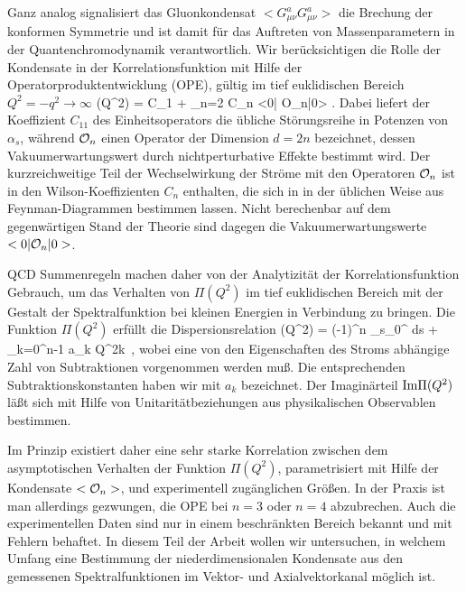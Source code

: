 Ganz analog signalisiert das Gluonkondensat $<G_{\mu\nu}^{a}
G^{a}_{\mu\nu}>$ die Brechung der konformen Symmetrie und ist 
damit f\"ur das Auftreten von Massenparametern in der 
Quantenchromodynamik verantwortlich. Wir ber\"ucksichtigen die
Rolle der Kondensate in der Korrelationsfunktion mit Hilfe
der Operatorproduktentwicklung (OPE), g\"ultig im tief
euklidischen Bereich $Q^2=-q^2\to\infty$
\be
\label{ope}
 \Pi (Q^2) =  C_{1\!}  + \sum_{n=2} 
        C_n <0| {\cal O}_n|0> \; .
\ee
Dabei liefert der Koeffizient $C_{1\!\!1}$ des Einheitsoperators
die \"ubliche St\"orungsreihe in Potenzen von $\alpha_s$,
w\"ahrend ${\cal O}_n$ einen Operator der Dimension $d=2n$
bezeichnet, dessen Vakuumerwartungswert durch nichtperturbative
Effekte bestimmt wird. Der kurzreichweitige Teil der 
Wechselwirkung der Str\"ome mit den Operatoren ${\cal O}_n$ ist
in den Wilson-Koeffizienten $C_n$ enthalten, die sich in 
in der \"ublichen Weise aus Feynman-Diagrammen bestimmen lassen. 
Nicht berechenbar auf dem gegenw\"artigen Stand der Theorie sind 
dagegen die  Vakuumerwartungswerte $<0|{\cal O}_n|0>$.

QCD Summenregeln machen daher von der Analytizit\"at der 
Korrelationsfunktion Gebrauch, um das Verhalten von $\Pi (Q^2)$ 
im tief euklidischen Bereich mit der Gestalt der Spektralfunktion 
bei kleinen Energien in Verbindung zu bringen. Die Funktion 
$\Pi (Q^2)$ erf\"ullt die Dispersionsrelation 
\be 
\label{disprel}
 \Pi (Q^2) = (-1)^n  \int_{s_0}^{\infty}
     ds +
    \sum_{k=0}^{n-1} a_k Q^{2k}\, ,
\ee
wobei eine von den Eigenschaften des Stroms abh\"angige Zahl von 
Subtraktionen vorgenommen werden mu\ss .  Die entsprechenden  
Subtraktionskonstanten haben wir mit $a_k$ bezeichnet. 
Der Imagin\"arteil ${\rm Im}\Pi (Q^2)$ l\"a\ss t sich mit
Hilfe von  Unitarit\"atbeziehungen aus physikalischen
Observablen bestimmen.

Im Prinzip existiert daher eine sehr starke Korrelation zwischen 
dem asymptotischen Verhalten der Funktion $\Pi (Q^2)$, parametrisiert
mit Hilfe der Kondensate $<{\cal O}_n>$, und experimentell 
zug\"anglichen Gr\"o\ss en. In der Praxis ist man allerdings 
gezwungen, die OPE bei $n=3$ oder $n=4$ abzubrechen. Auch die
experimentellen Daten sind nur in einem beschr\"ankten Bereich 
bekannt und mit Fehlern behaftet. In diesem Teil der Arbeit wollen
wir untersuchen, in welchem Umfang eine Bestimmung der 
niederdimensionalen Kondensate aus den gemessenen Spektralfunktionen 
im Vektor- und Axialvektorkanal m\"oglich ist. 

